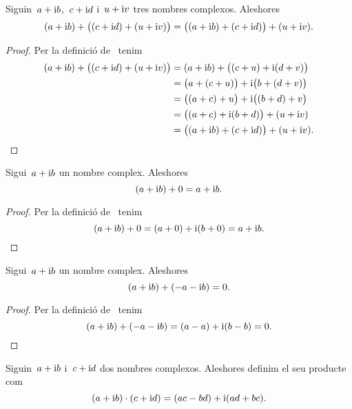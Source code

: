 \documentclass[../Apunts.tex]{subfiles}
\begin{document}
    \begin{proposition}
        \label{prop:els nombres complexos són associatius per la suma}
        Siguin~\(a+\mathrm{i} b\),~\(c+\mathrm{i} d\) i~\(u+\mathrm{i} v\) tres nombres complexos.
        Aleshores
        \[
            (a+\mathrm{i} b)+\big((c+\mathrm{i} d)+(u+\mathrm{i} v)\big) = 
            \big((a+\mathrm{i} b)+(c+\mathrm{i} d)\big)+(u+\mathrm{i} v).
        \]
    \end{proposition}
    \begin{proof}
        Per la definició de~ tenim
        \begin{align*}
            (a+\mathrm{i} b)+\big((c+\mathrm{i} d)+(u+\mathrm{i} v)\big)
            &=(a+\mathrm{i} b)+\big((c+u)+\mathrm{i}(d+v)\big) \\
            &=\big(a+(c+u)\big)+\mathrm{i}\big(b+(d+v)\big) \\
            &=\big((a+c)+u\big)+\mathrm{i}\big((b+d)+v\big) \\
            &=\big((a+c)+\mathrm{i}(b+d)\big)+(u+\mathrm{i} v) \\
            &=\big((a+\mathrm{i} b)+(c+\mathrm{i} d)\big)+(u+\mathrm{i} v).\qedhere
        \end{align*}
    \end{proof}
    \begin{proposition}
        \label{prop:element neutre per la suma dels complexos}
        Sigui~\(a+\mathrm{i} b\) un nombre complex.
        Aleshores
        \[(a+\mathrm{i} b)+0=a+\mathrm{i} b.\]
    \end{proposition}
    \begin{proof}
        Per la definició de~ tenim
        \[(a+\mathrm{i} b)+0=(a+0)+\mathrm{i}(b+0)=a+\mathrm{i} b.\qedhere\]
    \end{proof}
    \begin{proposition}
        \label{prop:element invers per la suma dels complexos}
        Sigui~\(a+\mathrm{i} b\) un nombre complex.
        Aleshores
        \[(a+\mathrm{i} b)+(-a-\mathrm{i} b)=0.\]
    \end{proposition}
    \begin{proof}
        Per la definició de~ tenim
        \[(a+\mathrm{i} b)+(-a-\mathrm{i} b)=(a-a)+\mathrm{i}(b-b)=0.\qedhere\]
    \end{proof}
    \begin{definition}
        \label{def:producte de nombres complexos}
        Siguin~\(a+\mathrm{i} b\) i~\(c+\mathrm{i} d\) dos nombres complexos.
        Aleshores definim el seu producte com
        \[(a+\mathrm{i} b)\cdot(c+\mathrm{i} d)=(ac-bd)+\mathrm{i}(ad+bc).\]
    \end{definition}
\end{document}
